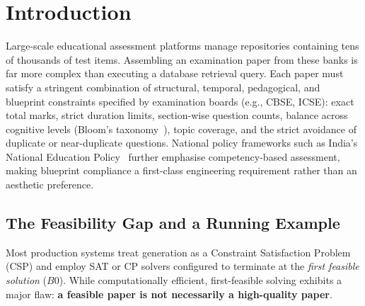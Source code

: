 \documentclass[runningheads]{llncs}
\begin{document}
\section{Introduction}
\label{sec:intro}

Large-scale educational assessment platforms manage repositories containing tens of thousands of test items.
Assembling an examination paper from these banks is far more complex than executing a database retrieval query.
Each paper must satisfy a stringent combination of structural, temporal, pedagogical, and blueprint constraints specified by examination boards (e.g., CBSE, ICSE): exact total marks, strict duration limits, section-wise question counts, balance across cognitive levels (Bloom's taxonomy~\cite{bloom1956,anderson2001}), topic coverage, and the strict avoidance of duplicate or near-duplicate questions.
National policy frameworks such as India's National Education Policy~\cite{moenep2020} further emphasise competency-based assessment, making blueprint compliance a first-class engineering requirement rather than an aesthetic preference.

\subsection{The Feasibility Gap and a Running Example}
Most production systems treat generation as a Constraint Satisfaction Problem (CSP) and employ SAT or CP solvers configured to terminate at the \emph{first feasible solution} ($B0$).
While computationally efficient, first-feasible solving exhibits a major flaw: \textbf{a feasible paper is not necessarily a high-quality paper}.
\end{document}
